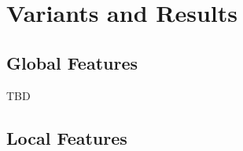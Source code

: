 \section{Variants and Results}\label{sec:results}

\subsection{Global Features}

TBD

\begin{figure}[h]
    
    \caption[canny stuff]{
    }
    \label{fig:pipeline_global_luma_mean_l2}
\end{figure}

\begin{figure}[h]
    
    \caption[canny stuff]{
    }
    \label{fig:pipeline_global_luma_canny_mean_l2}
\end{figure}

\subsection{Local Features}

\begin{figure}[h]
    
    \caption[canny stuff]{
    }
    \label{fig:pipeline_local_luma_canny_pmean_l2}
\end{figure}
